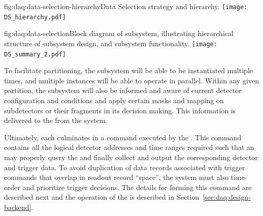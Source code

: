 \begin{dunefigure}{fig:daq:data-selection-hierarchy}{Data Selection
    strategy and hierarchy.}
  \texttt{[image: DS\_hierarchy.pdf]}
\end{dunefigure}

\begin{dunefigure}{fig:daq:data-selection}{Block diagram of  
     subsystem, illustrating hierarchical structure of
    subsystem design, and subsystem functionality.}
  \texttt{[image: DS\_summary\_2.pdf]}
\end{dunefigure}

To facilitate partitioning, the  subsystem will be able to be
instantiated multiple times, and multiple instances will be able to operate in
parallel.
Within any given partition, the  subsystem will also be informed
and aware of current detector configuration and conditions and apply certain
masks and mapping on subdetectors or their fragments in its decision making.
This information is delivered to the  from the 
system.

Ultimately, each  culminates in a command executed by the
. 
This command contains all the logical detector addresses and time ranges
required such that an  may properly query the  and
finally collect and output the corresponding detector and trigger data.
To avoid duplication of data records associated with trigger commands that
overlap in readout record ``space'', the  system must also
time-order and prioritize trigger decisions.
The details for forming this command are described next and the operation of the
 is described in Section~\ref{sec:daq:design-backend}.

